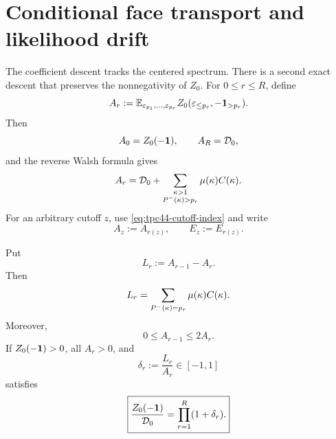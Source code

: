 \section{Conditional face transport and likelihood drift}
\label{sec:tpc44-face-transport}

The coefficient descent tracks the centered spectrum.  There is a
second exact descent that preserves the nonnegativity of \(Z_0\).  For
\(0\le r\le R\), define
\begin{equation}
 A_r:=
 \mathbb E_{\varepsilon_{p_1},\ldots,\varepsilon_{p_r}}
 Z_0(\varepsilon_{\le p_r},-\mathbf 1_{>p_r}).
 \label{eq:tpc44-Ar}
\end{equation}
Then
\begin{equation}
 A_0=Z_0(-\mathbf 1),
 \qquad A_R=\mathcal D_0,
 \label{eq:tpc44-Ar-endpoints}
\end{equation}
and the reverse Walsh formula gives
\begin{equation}
 A_r=\mathcal D_0+
 \sum_{\substack{\kappa>1\\P^{-}(\kappa)>p_r}}
 \mu(\kappa)C(\kappa).
 \label{eq:tpc44-Ar-spectrum}
\end{equation}
For an arbitrary cutoff \(z\), use \eqref{eq:tpc44-cutoff-index} and write
\begin{equation}
 A_z:=A_{r(z)},
 \qquad E_z:=E_{r(z)}.
 \label{eq:tpc44-Az-definition}
\end{equation}

\begin{proposition}
\label{prop:tpc44-least-prime-increment}
Put
\begin{equation}
 L_r:=A_{r-1}-A_r.
 \label{eq:tpc44-Lr}
\end{equation}
Then
\begin{equation}
 L_r=\sum_{P^{-}(\kappa)=p_r}\mu(\kappa)C(\kappa).
 \label{eq:tpc44-Lr-spectrum}
\end{equation}
Moreover,
\begin{equation}
 0\le A_{r-1}\le2A_r.
 \label{eq:tpc44-face-doubling}
\end{equation}
If \(Z_0(-\mathbf 1)>0\), all \(A_r>0\), and
\begin{equation}
 \delta_r:=\frac{L_r}{A_r}\in[-1,1]
 \label{eq:tpc44-delta}
\end{equation}
satisfies
\begin{equation}
 \boxed{
 \frac{Z_0(-\mathbf 1)}{\mathcal D_0}
 =\prod_{r=1}^{R}(1+\delta_r).}
 \label{eq:tpc44-face-product}
\end{equation}
\end{proposition}

